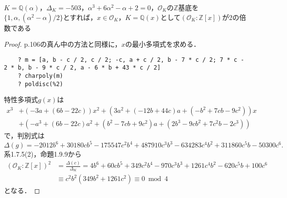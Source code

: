 \begin{screen}
  $K=\mathbb{Q}(\alpha)$，$\varDelta_K=-503$，$\alpha^3+6\alpha^2-\alpha+2=0$，$\mathcal{O}_K$の$\mathbb{Z}$基底を$\{1, \alpha, (\alpha^2-\alpha)/2\}$とすれば，$x\in\mathcal{O}_K$，$K=\mathbb{Q}(x)$として$(\mathcal{O}_K:\mathbb{Z}[x])$が$2$の倍数である
\end{screen}
\begin{proof}

  p.106の真ん中の方法と同様に，$x$の最小多項式を求める．
  \begin{lstlisting}
    ? m = [a, b - c / 2, c / 2; -c, a + c / 2, b - 7 * c / 2; 7 * c - 2 * b, b - 9 * c / 2, a - 6 * b + 43 * c / 2]
    ? charpoly(m)
    ? poldisc(%2)
  \end{lstlisting}
  特性多項式$g(x)$は
  \begin{align*}
    x^3 &+ (-3a + (6b - 22c))x^2 + (3a^2 + (-12b + 44c)a + (-b^2 + 7cb - 9c^2))x \\
        &+ (-a^3 + (6b - 22c)a^2 + (b^2 - 7cb + 9c^2)a + (2b^3 - 9cb^2 + 7c^2b - 2c^3))
  \end{align*}
  で，判別式は
  \[\varDelta(g)=-2012b^6 + 30180cb^5 - 175547c^2b^4 + 487910c^3b^3 - 634283c^4b^2 + 311860c^5b - 50300c^6.\]
  系1.7.5(2)，命題1.9.9から
  \begin{align*}
    (\mathcal{O}_K:\mathbb{Z}[x])^2 &= \frac{\varDelta(c)}{\varDelta_K} = 4b^6+60cb^5+349c^2b^4-970c^3b^3+1261c^4b^2-620c^5b+100c^6\\
    &\equiv c^2b^2(349b^2+1261c^2)\equiv0\bmod4
  \end{align*}
  となる．
\end{proof}

